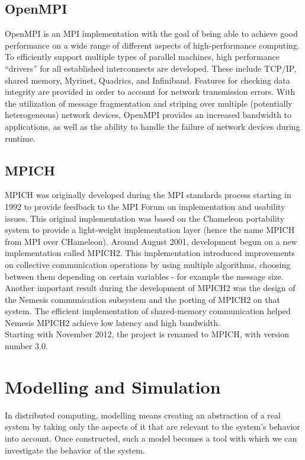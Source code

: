 \subsection{OpenMPI}
OpenMPI is an MPI implementation with the goal of being able to
achieve good performance on a wide range of different aspects of
high-performance computing. To efficiently support multiple types of
parallel machines, high performance “drivers” for all established
interconnects are developed. These include TCP/IP, shared memory,
Myrinet, Quadrics, and Infiniband. Features for checking data
integrity are provided in order to account for network transmission
errors. With the utilization of message fragmentation and striping
over multiple (potentially heterogeneous) network devices, OpenMPI
provides an increased bandwidth to applications, as well as the
ability to handle the failure of network devices during
runtime.\cite{ompi04}
\subsection{MPICH}
MPICH was originally developed during the MPI standards process
starting in 1992 to provide feedback to the MPI Forum on
implementation and usability issues. This original implementation was
based on the Chameleon portability system to provide a light-weight
implementation layer (hence the name MPICH from MPI over
CHameleon). Around August 2001, development begun on a new
implementation called MPICH2.\cite{mpich12} This implementation
introduced improvements on collective communication operations by
using multiple algorithms, choosing between them depending on certain
variables - for example the message size.\cite{trg05} Another
important result during the development of MPICH2 was the design of
the Nemesis communication subsystem and the porting of MPICH2 on that
system. The efficient implementation of shared-memory communication
helped Nemesis MPICH2 achieve low latency and high
bandwidth.\cite{bmg07}\\
Starting with November 2012, the project is renamed to MPICH, with
version number 3.0.\cite{mpich12}
\section{Modelling and Simulation}
In distributed computing, modelling means creating an abstraction of a
real system by taking only the aspects of it that are relevant to the
system's behavior into account. Once constructed, such a model becomes
a tool with which we can investigate the behavior of the
system.\cite{h12_1}
